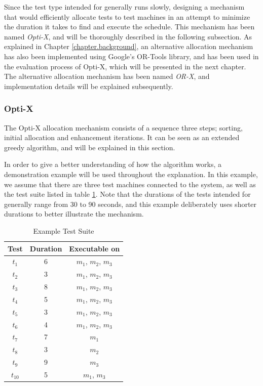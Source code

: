 Since the test type intended for \toolname \space generally runs slowly, designing a mechanism that would efficiently allocate tests to test machines in an attempt to minimize the duration it takes to find and execute the schedule. This mechanism has been named \emph{Opti-X}, and will be thoroughly described in the following subsection. As explained in Chapter \ref{chapter.background}, an alternative allocation mechanism has also been implemented using Google's OR-Tools library, and has been used in the evaluation process of Opti-X, which will be presented in the next chapter. The alternative allocation mechanism has been named \emph{OR-X}, and implementation details will be explained subsequently.

\subsubsection{Opti-X}

The Opti-X allocation mechanism consists of a sequence three steps; sorting, initial allocation and enhancement iterations. It can be seen as an extended greedy algorithm, and will be explained in this section.

In order to give a better understanding of how the algorithm works, a demonstration example will be used throughout the explanation. In this example, we assume that there are three test machines connected to the system, as well as the test suite listed in table \ref{testsuite}. Note that the durations of the tests intended for \toolname \space generally range from 30 to 90 seconds, and this example deliberately uses shorter durations to better illustrate the mechanism.

\begin{table}[h!]
  \begin{tabular}{c c c}
    \hline
    \textbf{Test} & \textbf{Duration} & \textbf{Executable on}\\
    \hline
    $t_{1}$     &   6   &   $m_{1}$, $m_{2}$, $m_{3}$\\
    $t_{2}$     &   3   &   $m_{1}$, $m_{2}$, $m_{3}$\\
    $t_{3}$     &   8   &   $m_{1}$, $m_{2}$, $m_{3}$\\
    $t_{4}$     &   5   &   $m_{1}$, $m_{2}$, $m_{3}$\\
    $t_{5}$     &   3   &   $m_{1}$, $m_{2}$, $m_{3}$\\
    $t_{6}$     &   4   &   $m_{1}$, $m_{2}$, $m_{3}$\\
    $t_{7}$     &   7   &   $m_{1}$\\
    $t_{8}$     &   3   &   $m_{2}$\\
    $t_{9}$     &   9   &   $m_{3}$\\
    $t_{10}$    &   5   &   $m_{1}$, $m_{3}$\\
    \hline
  \end{tabular}
  \centering
  \caption{Example Test Suite}
  \label{testsuite}
\end{table}

